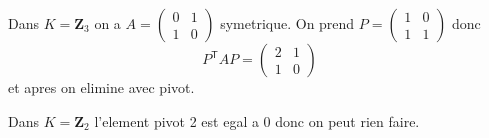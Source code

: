 \begin{example}
Dans $K=\mathbf{Z}_{3}$ on a $A=\begin{pmatrix}0 & 1  \\ 1 & 0\end{pmatrix}$ symetrique. On prend $P=\begin{pmatrix}1 & 0 \\ 1 & 1\end{pmatrix}$ donc
$$
P^{\mathsf{T}}AP=\begin{pmatrix}
2 & 1  \\
1 & 0
\end{pmatrix}
$$
et apres on elimine avec pivot.

Dans $K=\mathbf{Z}_{2}$ l'element pivot 2 est egal a 0 donc on peut rien faire.
\end{example}

